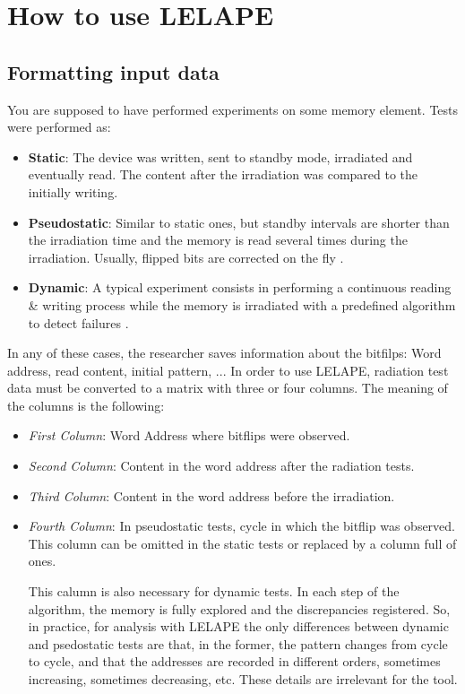 \chapter{How to use LELAPE}
\section{Formatting input data}
%
You are supposed to have performed experiments on some memory element. Tests were performed as:
\begin{itemize}
	\item \textbf{Static}: The device was written, sent to standby mode, irradiated and eventually read. The content after the irradiation was compared to the initially writing.
	\item \textbf{Pseudostatic}: Similar to static ones, but standby intervals are shorter than the irradiation time and the memory is read several times during the irradiation. Usually, flipped bits are corrected on the fly \cite{Gupta2017}.
	\item \textbf{Dynamic}: A typical experiment consists in performing a continuous reading \& writing process while the memory is irradiated with a predefined algorithm to detect failures \cite{Tsiligiannis2014a, Tsiligiannis2014b}. 
\end{itemize}

In any of these cases, the researcher saves information about the bitfilps: Word address, read content, initial pattern, ... 
In order to use LELAPE, radiation test data must be converted to a matrix with three or four columns. The meaning of the columns is the following:
\begin{itemize}
	\item \textit{First Column}: Word Address where bitflips were observed.
	\item \textit{Second Column}: Content in the word address after the radiation tests.
	\item \textit{Third Column}: Content in the word address before the irradiation.
	\item \textit{Fourth Column}: In pseudostatic tests, cycle in which the bitflip was observed. This column can be omitted in the static tests or replaced by a column full of ones.  
	
	This calumn is also necessary for dynamic tests. In each step of the algorithm, the memory is fully explored and the discrepancies registered. So, in practice, for analysis with LELAPE the only differences between dynamic and psedostatic tests are that, in the former, the pattern changes from cycle to cycle, and that the addresses are recorded in different orders, sometimes increasing, sometimes decreasing, etc. These details are irrelevant for the tool.
\end{itemize} 

